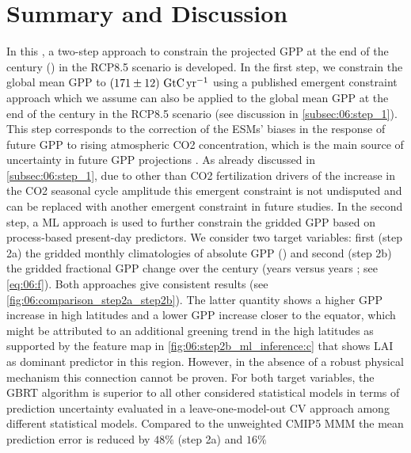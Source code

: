 \section{Summary and Discussion}
\label{sec:06:summary_and_discussion}

In this , a two-step approach to constrain the
projected \ac{GPP} at the end of the  century () in
the \acs{RCP}8.5 scenario is developed. In the first step, we constrain the
global mean \ac{GPP} to $\pmrangeunit{171}{12}{\GtCyr{}}$ using a published
emergent constraint approach which we assume can also be applied to the global
mean \ac{GPP} at the end of the  century in the \acs{RCP}8.5 scenario
(see discussion in \cref{subsec:06:step_1}). This step corresponds to the
correction of the \acp{ESM}' biases in the response of future \ac{GPP} to
rising atmospheric \ac{CO2} concentration, which is the main source of
uncertainty in future \ac{GPP} projections \autocite{Arora2013, Haverd2020,
  Rogers2017}. As already discussed in \cref{subsec:06:step_1}, due to other
than \ac{CO2} fertilization drivers of the increase in the \ac{CO2} seasonal
cycle amplitude \autocite{Bastos2019, Forkel2016, Piao2018, Zhao2016} this
emergent constraint is not undisputed and can be replaced with another emergent
constraint in future studies. In the second step, a \ac{ML} approach is used to
further constrain the gridded \ac{GPP} based on process-based present-day
predictors. We consider two target variables: first (step 2a) the gridded
monthly climatologies of absolute \ac{GPP} () and second
(step 2b) the gridded fractional \ac{GPP} change over the  century
(years  versus years ; see \cref{eq:06:f}).
Both approaches give consistent results (see
\cref{fig:06:comparison_step2a_step2b}). The latter quantity shows a higher
\ac{GPP} increase in high latitudes and a lower \ac{GPP} increase closer to the
equator, which might be attributed to an additional greening trend in the high
latitudes as supported by the feature map in
\cref{fig:06:step2b_ml_inference:c} that shows \ac{LAI} as dominant predictor
in this region. However, in the absence of a robust physical mechanism this
connection cannot be proven. For both target variables, the \ac{GBRT} algorithm
is superior to all other considered statistical models in terms of prediction
uncertainty evaluated in a leave-one-model-out \ac{CV} approach among different
statistical models. Compared to the unweighted \acs{CMIP}5 \ac{MMM} the mean
prediction error is reduced by $48 \unit{\%}$ (step 2a) and $16 \unit{\%}$
